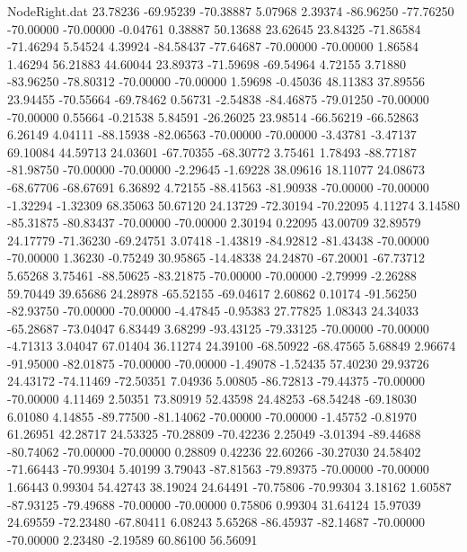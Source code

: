 \begin{filecontents}{NodeRight.dat}
  23.78236  -69.95239  -70.38887     5.07968    2.39374  -86.96250  -77.76250  -70.00000  -70.00000   -0.04761    0.38887   50.13688   23.62645
  23.84325  -71.86584  -71.46294     5.54524    4.39924  -84.58437  -77.64687  -70.00000  -70.00000    1.86584    1.46294   56.21883   44.60044
  23.89373  -71.59698  -69.54964     4.72155    3.71880  -83.96250  -78.80312  -70.00000  -70.00000    1.59698   -0.45036   48.11383   37.89556
  23.94455  -70.55664  -69.78462     0.56731   -2.54838  -84.46875  -79.01250  -70.00000  -70.00000    0.55664   -0.21538    5.84591  -26.26025
  23.98514  -66.56219  -66.52863     6.26149    4.04111  -88.15938  -82.06563  -70.00000  -70.00000   -3.43781   -3.47137   69.10084   44.59713
  24.03601  -67.70355  -68.30772     3.75461    1.78493  -88.77187  -81.98750  -70.00000  -70.00000   -2.29645   -1.69228   38.09616   18.11077
  24.08673  -68.67706  -68.67691     6.36892    4.72155  -88.41563  -81.90938  -70.00000  -70.00000   -1.32294   -1.32309   68.35063   50.67120
  24.13729  -72.30194  -70.22095     4.11274    3.14580  -85.31875  -80.83437  -70.00000  -70.00000    2.30194    0.22095   43.00709   32.89579
  24.17779  -71.36230  -69.24751     3.07418   -1.43819  -84.92812  -81.43438  -70.00000  -70.00000    1.36230   -0.75249   30.95865  -14.48338
  24.24870  -67.20001  -67.73712     5.65268    3.75461  -88.50625  -83.21875  -70.00000  -70.00000   -2.79999   -2.26288   59.70449   39.65686
  24.28978  -65.52155  -69.04617     2.60862    0.10174  -91.56250  -82.93750  -70.00000  -70.00000   -4.47845   -0.95383   27.77825    1.08343
  24.34033  -65.28687  -73.04047     6.83449    3.68299  -93.43125  -79.33125  -70.00000  -70.00000   -4.71313    3.04047   67.01404   36.11274
  24.39100  -68.50922  -68.47565     5.68849    2.96674  -91.95000  -82.01875  -70.00000  -70.00000   -1.49078   -1.52435   57.40230   29.93726
  24.43172  -74.11469  -72.50351     7.04936    5.00805  -86.72813  -79.44375  -70.00000  -70.00000    4.11469    2.50351   73.80919   52.43598
  24.48253  -68.54248  -69.18030     6.01080    4.14855  -89.77500  -81.14062  -70.00000  -70.00000   -1.45752   -0.81970   61.26951   42.28717
  24.53325  -70.28809  -70.42236     2.25049   -3.01394  -89.44688  -80.74062  -70.00000  -70.00000    0.28809    0.42236   22.60266  -30.27030
  24.58402  -71.66443  -70.99304     5.40199    3.79043  -87.81563  -79.89375  -70.00000  -70.00000    1.66443    0.99304   54.42743   38.19024
  24.64491  -70.75806  -70.99304     3.18162    1.60587  -87.93125  -79.49688  -70.00000  -70.00000    0.75806    0.99304   31.64124   15.97039
  24.69559  -72.23480  -67.80411     6.08243    5.65268  -86.45937  -82.14687  -70.00000  -70.00000    2.23480   -2.19589   60.86100   56.56091

\end{filecontents}
